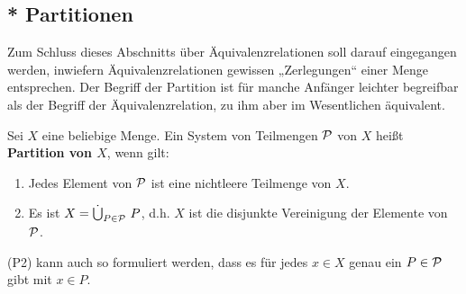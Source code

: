 \subsection*{* Partitionen}


Zum Schluss dieses Abschnitts über Äquivalenzrelationen soll darauf eingegangen werden, inwiefern Äquivalenzrelationen gewissen „Zerlegungen“ einer Menge entsprechen. Der Begriff der Partition ist für manche Anfänger leichter begreifbar als der Begriff der Äquivalenzrelation, zu ihm aber im Wesentlichen äquivalent.


\begin{defin}[Partition] 
    Sei $X$ eine beliebige Menge. Ein System von Teilmengen $\mathcal P$ von $X$ heißt \textbf{Partition von $X$}, wenn gilt:
    \begin{enumerate}[label=(P\arabic*), labelindent=1.5em, leftmargin=*]
        \item Jedes Element von $\mathcal P$ ist eine nichtleere Teilmenge von $X$.
        \item Es ist $X=\dot{\bigcup}_{P\in \calP}\ P$, d.h. $X$ ist die disjunkte Vereinigung der Elemente von $\mathcal P$.
    \end{enumerate}
    (P2) kann auch so formuliert werden, dass es für jedes $x\in X$ genau ein $P\in \mathcal P$ gibt mit $x\in P$.
\end{defin}


